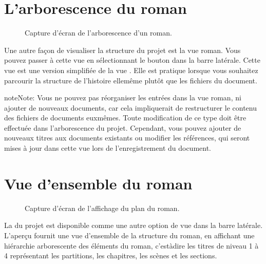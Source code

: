 \documentclass[a4paper,11pt,french]{sphinxmanual}
\begin{document}
\section{L’arborescence du roman}
\label{\detokenize{usage_project:the-novel-tree-view}}\label{\detokenize{usage_project:a-ui-tree-novel}}
\begin{figure}[htbp]
\centering
\capstart

\noindent{}
\caption{Capture d’écran de l’arborescence d’un roman.}\label{\detokenize{usage_project:id4}}\end{figure}

\sphinxAtStartPar
Une autre façon de visualiser la structure du projet est la vue roman. Vous pouvez passer à cette vue en sélectionnant le bouton  dans la barre latérale. Cette vue est une version simplifiée de la vue . Elle est pratique lorsque vous souhaitez parcourir la structure de l’histoire elle\sphinxhyphen{}même plutôt que les fichiers du document.

\begin{sphinxadmonition}{note}{Note:}
\sphinxAtStartPar
Vous ne pouvez pas réorganiser les entrées dans la vue roman, ni ajouter de nouveaux documents, car cela impliquerait de restructurer le contenu des fichiers de documents eux\sphinxhyphen{}mêmes. Toute modification de ce type doit être effectuée dans l’arborescence du projet. Cependant, vous pouvez ajouter de nouveaux titres aux documents existants ou modifier les références, qui seront mises à jour dans cette vue lors de l’enregistrement du document.
\end{sphinxadmonition}


\section{Vue d’ensemble du roman}
\label{\detokenize{usage_project:the-novel-outline-view}}\label{\detokenize{usage_project:a-ui-outline}}
\begin{figure}[htbp]
\centering
\capstart

\noindent{}
\caption{Capture d’écran de l’affichage du plan du roman.}\label{\detokenize{usage_project:id5}}\end{figure}

\sphinxAtStartPar
La  du projet est disponible comme une autre option de vue dans la barre latérale. L’aperçu fournit une vue d’ensemble de la structure du roman, en affichant une hiérarchie arborescente des éléments du roman, c’est\sphinxhyphen{}à\sphinxhyphen{}dire les titres de niveau 1 à 4 représentant les partitions, les chapitres, les scènes et les sections.
\end{document}
